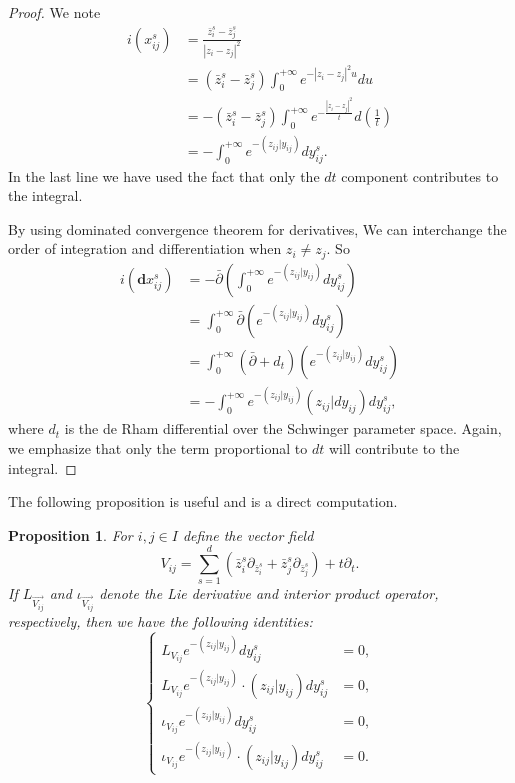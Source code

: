 \documentclass[11pt]{amsart}
\newtheorem{prop}[thm]{Proposition}
\theoremstyle{definition}
\theoremstyle{remark}
\numberwithin{equation}{section}
\begin{document}
\begin{proof}
    We note
    \begin{align*}
        i(x_{ij}^{s})
        &=
        \frac{\bar{z}_{i}^{s} - \bar{z}_{j}^{s}}{|z_{i} - z_{j}|^{2}}\\
        &=
        (\bar{z}_{i}^{s} - \bar{z}_{j}^{s})\int_{0}^{+\infty}e^{-|z_{i} - z_{j}|^{2}u}du\\
        &=
        -(\bar{z}_{i}^{s} - \bar{z}_{j}^{s})\int_{0}^{+\infty}e^{-\frac{|z_{i} - z_{j}|^{2}}{t}}d\left(\frac{1}{t}\right)\\
        &=
        -\int_{0}^{+\infty}e^{-(z_{ij}| y_{ij})}dy_{ij}^{s}.
    \end{align*}
    In the last line we have used the fact that only the $d t$ component contributes to the integral.

    By using dominated convergence theorem for derivatives, We can interchange the order of integration and differentiation when $z_{i}\neq z_{j}$. So
    \begin{align*}
        i(\mathbf{d}x_{ij}^{s})
        &=
        -\bar{\partial}\left(\int_{0}^{+\infty}e^{-(z_{ij}| y_{ij})}dy_{ij}^{s}\right)\\
        &=
        \int_{0}^{+\infty}\bar{\partial}\left(e^{-(z_{ij}| y_{ij})}dy_{ij}^{s}\right)\\
        &=
        \int_{0}^{+\infty}(\bar{\partial}+d_{t})\left(e^{-(z_{ij}| y_{ij})}dy_{ij}^{s}\right)\\
        &=
        -\int_{0}^{+\infty}e^{-(z_{ij}| y_{ij})}(z_{ij}| dy_{ij})dy_{ij}^{s},
    \end{align*}
    where $d_t$ is the de Rham differential over the Schwinger parameter space.
    Again, we emphasize that only the term proportional to $dt$ will contribute to the integral.
\end{proof}

The following proposition is useful and is a direct computation.

\begin{prop}\label{Lie and interior product}
    For $i,j \in  I$ define the vector field
    $$ V_{ij}=\sum_{s=1}^{d}(\bar{z}_i^s\partial_{\bar{z}_{i}^{s}}+\bar{z}_j^s\partial_{\bar{z}_{j}^{s}})+t\partial_{t}.
    $$
    If $L_{\vec{V_{ij}}}$ and $\iota_{\vec{V_{ij}}}$ denote the Lie derivative and interior product operator, respectively, then we have the following identities:
$$
\left\{
\begin{array}{cc}
     L_{V_{ij}}e^{-(z_{ij}| y_{ij})}dy_{ij}^s & =0,  \\
      L_{ V_{ij}}e^{-(z_{ij}| y_{ij})}\cdot(z_{ij}| y_{ij})dy_{ij}^s & =0,\\
      \iota_{ V_{ij}}e^{-(z_{ij}| y_{ij})}dy_{ij}^s & =0,\\
      \iota_{ V_{ij}}e^{-(z_{ij}| y_{ij})}\cdot(z_{ij}| y_{ij})dy_{ij}^s & =0.
\end{array}
\right.
$$
\end{prop}
\end{document}
